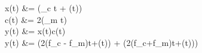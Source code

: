 x(t) &= \cos(\omega_c t + \theta(t))\\
c(t) &= 2\cos(\omega_m t)\\
y(t) &= x(t)\times c(t)\\
y(t) &= \cos(2\pi(f_c - f_m)t+\theta(t)) + \cos(2\pi(f_c+f_m)t+\theta(t)))